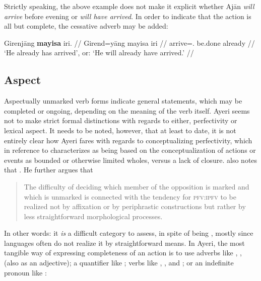 Strictly speaking, the above example does not make it explicit whether Ajān 
\emph{will arrive} before evening or \emph{will have arrived}. In order to 
indicate that the action is all but complete, the cessative adverb 
 may be added:

\ex
\begingl
	\gla Girenjāng \textbf{mayisa} iri. //
	\glb Girend=yāng mayisa iri //
	\glc arrive=\TsgM{}.\Aarg{} be.done already //
	\glft `He already has arrived', or: `He will already have arrived.' //
\endgl
\xe



\subsection{Aspect}
\label{subsec:aspect}

Aspectually unmarked verb forms indicate general statements, which may be
completed or ongoing, depending on the meaning of the verb itself. Ayeri seems
not to make strict formal distinctions with regards to either, perfectivity or
lexical aspect. It needs to be noted, however, that at least to date, it is not
entirely clear how Ayeri fares with regards to conceptualizing perfectivity,
which \citet[76]{dahl1985} in reference to
\citet[16]{comrie1976} characterizes as being based on the conceptualization of
actions or events as bounded or otherwise limited wholes, versus a lack of
closure. \citet{dahl1985} also notes that . He further argues that

\blockcquote[73]{dahl1985}{The difficulty of deciding which member of the
opposition is marked and which is unmarked is connected with the tendency for
\textsc{pfv:ipfv} to be realized not by affixation or by periphrastic
constructions but  rather by less straightforward morphological processes.}

In other words: it \emph{is} a difficult category to assess, in spite of being
,
mostly since languages often do not realize it by straightforward means. In
Ayeri, the most tangible way of expressing completeness of an action is to use
adverbs like , ,
 (also as an adjective); a quantifier like
; verbs like ,
, and ; or an indefinite
pronoun like :

